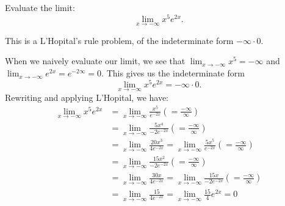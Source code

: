 \documentclass{ximera}
\author{Emma Smith Zbarsky}
\begin{document}
\begin{exercise}

Evaluate the limit: \[\lim_{x \to -\infty} x^5e^{2x}.\]


\begin{hint}
This is a L'Hopital's rule problem, of the indeterminate form
$-\infty \cdot 0.$
\end{hint}


\begin{hint}
When we naively evaluate our limit, we see that
$\lim_{x\to -\infty} x^5 = -\infty$ and
$\lim_{x\to -\infty} e^{2x} = e^{-2\infty} = 0.$ This gives us the
indeterminate form \[\lim_{x\to -\infty} x^5e^{2x} = -\infty\cdot 0.\]
Rewriting and applying L'Hopital, we have: \begin{align*}
\lim_{x\to -\infty} x^5e^{2x} &= \lim_{x\to -\infty} \frac{x^5}{e^{-2x}} \left(=\frac{-\infty}{\infty}\right)\\
&= \lim_{x\to -\infty} \frac{5x^4}{-2e^{-2x}} \left(=\frac{-\infty}{\infty}\right)\\
&= \lim_{x\to -\infty} \frac{20x^3}{4e^{-2x}} = \lim_{x\to -\infty} \frac{5x^5}{e^{-2x}} \left(=\frac{-\infty}{\infty}\right)\\
&= \lim_{x\to -\infty} \frac{15x^2}{-2e^{-2x}}  \left(=\frac{-\infty}{\infty}\right)\\
&= \lim_{x\to -\infty} \frac{30x}{4e^{-2x}}= \lim_{x\to -\infty} \frac{15x}{-2e^{-2x}}  \left(=\frac{-\infty}{\infty}\right)\\
&= \lim_{x\to -\infty} \frac{15}{4e^{-2x}} = \lim_{x\to -\infty} \frac{15}{4}e^{2x} = 0
\end{align*}
\end{hint}


\begin{multipleChoice}
\choice{$\infty$}
\choice{$-\infty$}
\end{multipleChoice}

\end{exercise}
\end{document}
